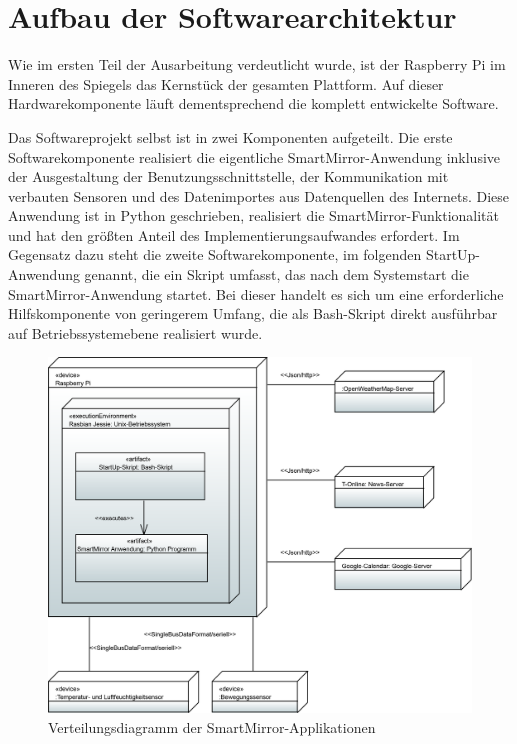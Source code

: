 \section{Aufbau der Softwarearchitektur}
Wie im ersten Teil der Ausarbeitung verdeutlicht wurde, ist der Raspberry Pi im Inneren des Spiegels das Kernstück der gesamten Plattform. Auf dieser Hardwarekomponente läuft dementsprechend die komplett entwickelte Software. 

Das Softwareprojekt selbst ist in zwei Komponenten aufgeteilt. Die erste Softwarekomponente realisiert die eigentliche SmartMirror-Anwendung inklusive der Ausgestaltung der Benutzungsschnittstelle, der Kommunikation mit verbauten Sensoren und des Datenimportes aus Datenquellen des Internets. Diese Anwendung ist in Python geschrieben, realisiert die SmartMirror-Funktionalität und hat den größten Anteil des Implementierungsaufwandes erfordert. Im Gegensatz dazu steht die zweite Softwarekomponente, im folgenden StartUp-Anwendung genannt, die ein Skript umfasst, das nach dem Systemstart die SmartMirror-Anwendung startet. Bei dieser handelt es sich um eine erforderliche Hilfskomponente von geringerem Umfang, die als Bash-Skript direkt ausführbar auf Betriebssystemebene realisiert wurde.  

\begin{figure}
	\centering
	\includegraphics[width=0.8\linewidth]{bilder/DeploymentDiagram}
	\caption[Verteilungsdiagramm der SmartMirror-Applikationen]{Verteilungsdiagramm der SmartMirror-Applikationen}
	\label{fig:verteilungsdiagramm}
\end{figure}

